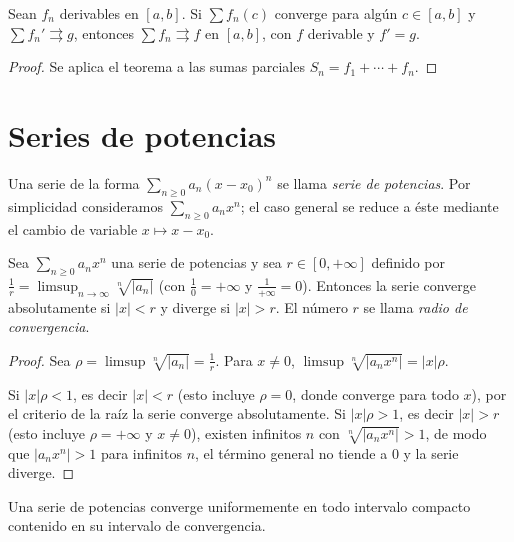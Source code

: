 \begin{corollary}
  Sean \(f_n\) derivables en \([a, b]\). Si \(\sum f_n(c)\) converge para algún \(c \in [a, b]\) y \(\sum f_n' \rightrightarrows g\), entonces \(\sum f_n \rightrightarrows f\) en \([a, b]\), con \(f\) derivable y \(f' = g\).
\end{corollary}

\begin{proof}
  Se aplica el teorema a las sumas parciales \(S_n = f_1 + \cdots + f_n\).
\end{proof}

\section{Series de potencias}

Una serie de la forma \(\sum_{n \geq 0} a_n {(x - x_0)}^n\) se llama \emph{serie de potencias}. Por simplicidad consideramos \(\sum_{n \geq 0} a_n x^n\); el caso general se reduce a éste mediante el cambio de variable \(x \mapsto x - x_0\).

\begin{theorem}
  Sea \(\sum_{n \geq 0} a_n x^n\) una serie de potencias y sea \(r \in [0, +\infty]\) definido por \(\frac{1}{r} = \limsup_{n \to \infty} \sqrt[n]{|a_n|}\) (con \(\frac{1}{0} = +\infty\) y \(\frac{1}{+\infty} = 0\)). Entonces la serie converge absolutamente si \(|x| < r\) y diverge si \(|x| > r\). El número \(r\) se llama \emph{radio de convergencia}.
\end{theorem}

\begin{proof}
  Sea \(\rho = \limsup \sqrt[n]{|a_n|} = \frac{1}{r}\). Para \(x \neq 0\), \(\limsup \sqrt[n]{|a_n x^n|} = |x| \rho\).

  Si \(|x| \rho < 1\), es decir \(|x| < r\) (esto incluye \(\rho = 0\), donde converge para todo \(x\)), por el criterio de la raíz la serie converge absolutamente. Si \(|x| \rho > 1\), es decir \(|x| > r\) (esto incluye \(\rho = +\infty\) y \(x \neq 0\)), existen infinitos \(n\) con \(\sqrt[n]{|a_n x^n|} > 1\), de modo que \(|a_n x^n| > 1\) para infinitos \(n\), el término general no tiende a \(0\) y la serie diverge.
\end{proof}

\begin{theorem}
  Una serie de potencias converge uniformemente en todo intervalo compacto contenido en su intervalo de convergencia.
\end{theorem}

